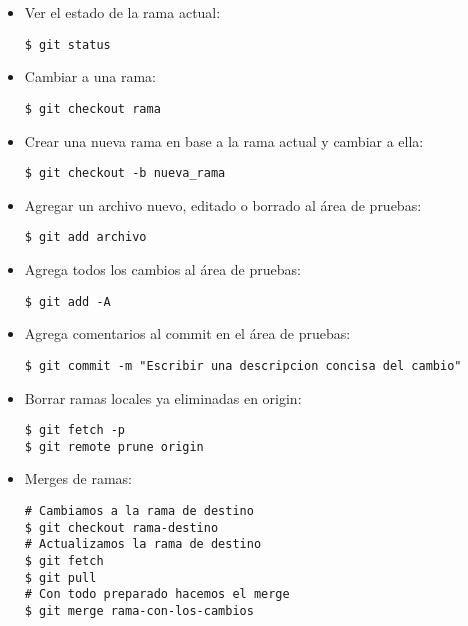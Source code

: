 \begin{itemize}[label=-]

\item Ver el estado de la rama actual:
\begin{lstlisting}
$ git status
\end{lstlisting}

\item Cambiar a una rama:
\begin{lstlisting}
$ git checkout rama
\end{lstlisting}

\item Crear una nueva rama en base a la rama actual y cambiar a ella:
\begin{lstlisting}
$ git checkout -b nueva_rama
\end{lstlisting}

\item Agregar un archivo nuevo, editado o borrado al área de pruebas:
\begin{lstlisting}
$ git add archivo
\end{lstlisting}

\item Agrega todos los cambios al área de pruebas:
\begin{lstlisting}
$ git add -A
\end{lstlisting}

\item Agrega comentarios al commit en el área de pruebas:
\begin{lstlisting}
$ git commit -m "Escribir una descripcion concisa del cambio"
\end{lstlisting}

\item Borrar ramas locales ya eliminadas en origin:
\begin{lstlisting}
$ git fetch -p
$ git remote prune origin
\end{lstlisting}

\item Merges de ramas:
\begin{lstlisting}
# Cambiamos a la rama de destino
$ git checkout rama-destino
# Actualizamos la rama de destino
$ git fetch
$ git pull
# Con todo preparado hacemos el merge
$ git merge rama-con-los-cambios
\end{lstlisting}

\end{itemize}



